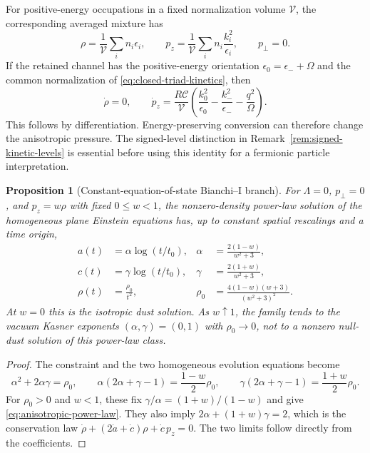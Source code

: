 \documentclass[11pt,a4paper,oneside]{book}
\theoremstyle{plain}
\newtheorem{proposition}[theorem]{Proposition}
\theoremstyle{definition}
\theoremstyle{remark}
\newcommand{\src}[2]{\cite{#1}}
\begin{document}
For positive-energy occupations in a fixed normalization volume
$\mathcal V$, the corresponding averaged mixture has
\begin{equation}
 \rho=\frac1{\mathcal V}\sum_i n_i\epsilon_i,
 \qquad p_z=\frac1{\mathcal V}\sum_i n_i\frac{k_i^2}{\epsilon_i},
 \qquad p_\perp=0.
 \label{eq:positive-occupation-stress}
\end{equation}
If the retained channel has the positive-energy orientation
$\epsilon_0=\epsilon_-+\Omega$ and the common normalization of
\eqref{eq:closed-triad-kinetics}, then
\begin{equation}
 \dot\rho=0,\qquad
 \dot p_z=\frac{R\mathcal C}{\mathcal V}
 \left(\frac{k_0^2}{\epsilon_0}-\frac{k_-^2}{\epsilon_-}
                         -\frac{q^2}{\Omega}\right).
 \label{eq:kinetic-pressure-drift}
\end{equation}
This follows by differentiation.  Energy-preserving conversion can
therefore change the anisotropic pressure.  The signed-level distinction
in Remark~\ref{rem:signed-kinetic-levels} is essential before using this
identity for a fermionic particle interpretation.
\src{R20}{thm:v20v36-mixture}

\begin{proposition}[Constant-equation-of-state Bianchi--I branch]
\label{prop:anisotropic-power-law}
For $\Lambda=0$, $p_\perp=0$, and $p_z=w\rho$ with fixed $0\le w<1$,
the nonzero-density power-law solution of the homogeneous plane Einstein
equations has, up to constant spatial rescalings and a time origin,
\begin{equation}
 \begin{aligned}
 a(t)&=\alpha\log(t/t_0),&
 \alpha&=\frac{2(1-w)}{w^2+3},\\
 c(t)&=\gamma\log(t/t_0),&
 \gamma&=\frac{2(1+w)}{w^2+3},\\
 \rho(t)&=\frac{\rho_0}{t^2},&
 \rho_0&=\frac{4(1-w)(w+3)}{(w^2+3)^2}.
 \end{aligned}
 \label{eq:anisotropic-power-law}
\end{equation}
At $w=0$ this is the isotropic dust solution.  As $w\uparrow1$, the
family tends to the vacuum Kasner exponents $(\alpha,\gamma)=(0,1)$
with $\rho_0\to0$, not to a nonzero null-dust solution of this power-law
class.
\end{proposition}
\begin{proof}
The constraint and the two homogeneous evolution equations become
\[
 \alpha^2+2\alpha\gamma=\rho_0,\qquad
 \alpha(2\alpha+\gamma-1)=\frac{1-w}{2}\rho_0,\qquad
 \gamma(2\alpha+\gamma-1)=\frac{1+w}{2}\rho_0.
\]
For $\rho_0>0$ and $w<1$, these fix
$\gamma/\alpha=(1+w)/(1-w)$ and give
\eqref{eq:anisotropic-power-law}.  They also imply
$2\alpha+(1+w)\gamma=2$, which is the conservation law
$\dot\rho+(2\dot a+\dot c)\rho+\dot c\,p_z=0$.
The two limits follow directly from the coefficients.
\end{proof}
\src{R20}{thm:v20v36-kasner}
\end{document}
